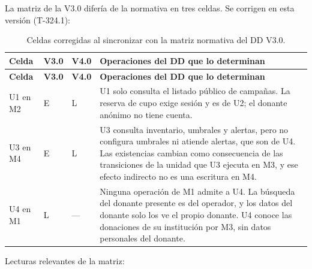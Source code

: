 \documentclass[11pt,a4paper]{article}
\begin{document}
\vspace{0.2cm}
\noindent La matriz de la V3.0 difería de la normativa en tres celdas. Se corrigen en esta versión (T-324.1):

\begin{longtable}{L{1.8cm} L{1.4cm} L{1.4cm} L{9.6cm}}
\caption{Celdas corregidas al sincronizar con la matriz normativa del DD V3.0.}\label{tab:sincronizacion}\\
\toprule
\textbf{Celda} & \textbf{V3.0} & \textbf{V4.0} & \textbf{Operaciones del DD que lo determinan} \\
\midrule
\endfirsthead
\toprule
\textbf{Celda} & \textbf{V3.0} & \textbf{V4.0} & \textbf{Operaciones del DD que lo determinan} \\
\midrule
\endhead
\bottomrule
\endlastfoot
U1 en M2 & E & L & U1 solo consulta el listado público de campañas. La reserva de cupo exige sesión y es de U2; el donante anónimo no tiene cuenta. \\
U3 en M4 & E & L & U3 consulta inventario, umbrales y alertas, pero no configura umbrales ni atiende alertas, que son de U4. Las existencias cambian como consecuencia de las transiciones de la unidad que U3 ejecuta en M3, y ese efecto indirecto no es una escritura en M4. \\
U4 en M1 & L & --- & Ninguna operación de M1 admite a U4. La búsqueda del donante presente es del operador, y los datos del donante solo los ve el propio donante. U4 conoce las donaciones de su institución por M3, sin datos personales del donante. \\
\end{longtable}

\vspace{0.2cm}
\noindent Lecturas relevantes de la matriz:
\end{document}
